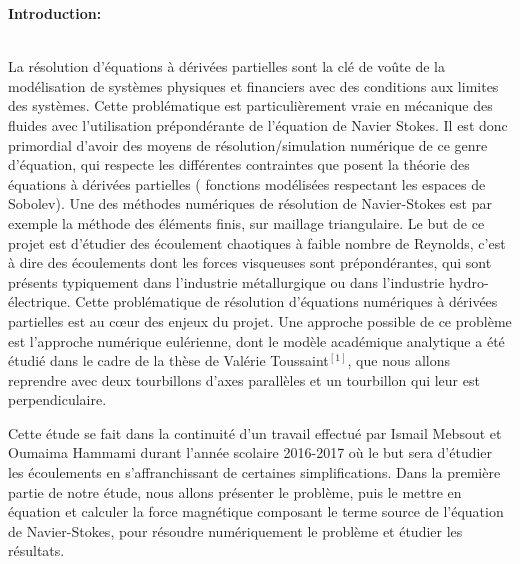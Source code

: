 \documentclass[a4paper,12pt,titlepage]{report}
\begin{document}
\tableofcontents

\newpage




\textbf{\Huge Introduction:}
\\
\\
\begin{onehalfspace}
La résolution d'équations à dérivées partielles sont la clé de voûte de la modélisation de systèmes physiques et financiers avec des conditions aux limites des systèmes. Cette problématique est particulièrement vraie en mécanique des fluides avec l'utilisation prépondérante de l'équation de Navier Stokes. Il est donc primordial d'avoir des moyens de résolution/simulation numérique de ce genre d'équation, qui respecte les différentes contraintes que posent la théorie des équations à dérivées partielles ( fonctions modélisées respectant les espaces de Sobolev). Une des méthodes numériques de résolution de Navier-Stokes est par exemple la méthode des éléments finis, sur maillage triangulaire. 
\newline
Le but de ce projet est d'étudier des écoulement chaotiques à faible nombre de Reynolds, c'est à dire des écoulements dont les forces visqueuses sont prépondérantes, qui sont présents typiquement dans l'industrie métallurgique ou dans l'industrie hydro-électrique. Cette problématique de résolution d'équations numériques à dérivées partielles est au cœur des enjeux du projet.
\newline
\newline
Une approche possible de ce problème est l'approche numérique eulérienne, dont le modèle académique analytique a été étudié dans le cadre de la thèse de Valérie Toussaint$^{[1]}$, que nous allons reprendre avec deux tourbillons d'axes parallèles et un tourbillon qui leur est perpendiculaire.

Cette étude se fait dans la continuité d'un travail effectué par Ismail Mebsout et Oumaima Hammami durant l'année scolaire 2016-2017 où le but sera d'étudier les écoulements en s'affranchissant de certaines simplifications.
Dans la première partie de notre étude, nous allons présenter le problème, puis le mettre en équation et calculer la force magnétique composant le terme source de l'équation de Navier-Stokes, pour résoudre numériquement le problème et étudier les résultats.


\end{onehalfspace}
\end{document}

